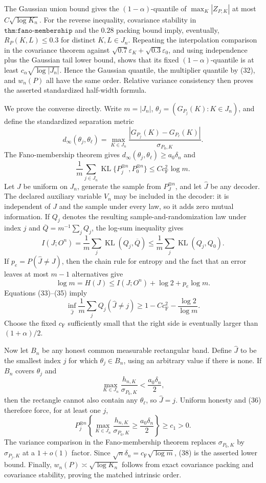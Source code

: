 The Gaussian union bound gives the \((1-\alpha)\)-quantile of \(\max_K|Z_{P,K}|\) at most \(C\sqrt{\log K_n}\).  For the reverse inequality, covariance stability in \(\texttt{thm:fano-membership}\) and the \(0.28\) packing bound imply, eventually, \(R_P(K,L)\leq0.3\) for distinct \(K,L\in J_n\).  Repeating the interpolation comparison in the covariance theorem against \(\sqrt{0.7}\varepsilon_K+\sqrt{0.3}\varepsilon_0\), and using independence plus the Gaussian tail lower bound, shows that its fixed \((1-\alpha)\)-quantile is at least \(c_\alpha\sqrt{\log|J_n|}\).  Hence the Gaussian quantile, the multiplier quantile by (32), and \(w_n(P)\) all have the same order.  Relative variance consistency then proves the asserted standardized half-width formula.

We prove the converse directly.  Write \(m=|J_n|\), \(\theta_j=(G_{P_j}(K):K\in J_n)\), and define the standardized separation metric
\[
 d_\infty(\theta_j,\theta_\ell)=
 \max_{K\in J_n}\frac{|G_{P_j}(K)-G_{P_\ell}(K)|}{\sigma_{P_0,K}}.
\]
The Fano-membership theorem gives \(d_\infty(\theta_j,\theta_\ell)\geq a_0\delta_n\) and
\[
 \frac1m\sum_{j\in J_n}\operatorname{KL}\{P_j^{\otimes n},P_0^{\otimes n}\}
 \leq Cc_{\mathrm F}^2\log m. \tag{33}
\]
Let \(J\) be uniform on \(J_n\), generate the sample from \(P_J^{\otimes n}\), and let \(\widehat J\) be any decoder.  The declared auxiliary variable \(V_n\) may be included in the decoder: it is independent of \(J\) and the sample under every law, so it adds zero mutual information.  If \(Q_j\) denotes the resulting sample-and-randomization law under index \(j\) and \(\overline Q=m^{-1}\sum_jQ_j\), the log-sum inequality gives
\[
 I(J;O^n)=\frac1m\sum_j\operatorname{KL}(Q_j,\overline Q)
 \leq\frac1m\sum_j\operatorname{KL}(Q_j,Q_0). \tag{34}
\]
If \(p_e=P(\widehat J\ne J)\), then the chain rule for entropy and the fact that an error leaves at most \(m-1\) alternatives give
\[
 \log m=H(J)\leq I(J;O^n)+\log2+p_e\log m. \tag{35}
\]
Equations (33)--(35) imply
\[
 \inf_{\widehat J}\frac1m\sum_jQ_j(\widehat J\ne j)
 \geq1-Cc_{\mathrm F}^2-\frac{\log2}{\log m}. \tag{36}
\]
Choose the fixed \(c_{\mathrm F}\) sufficiently small that the right side is eventually larger than \((1+\alpha)/2\).

Now let \(B_n\) be any honest common measurable rectangular band.  Define \(\widehat J\) to be the smallest index \(j\) for which \(\theta_j\in B_n\), using an arbitrary value if there is none.  If \(B_n\) covers \(\theta_j\) and
\[
 \max_{K\in J_n}\frac{h_{n,K}}{\sigma_{P_0,K}}<\frac{a_0\delta_n}{2}, \tag{37}
\]
then the rectangle cannot also contain any \(\theta_\ell\), so \(\widehat J=j\).  Uniform honesty and (36) therefore force, for at least one \(j\),
\[
 P_j^{\otimes n}\left\{\max_{K\in J_n}\frac{h_{n,K}}{\sigma_{P_0,K}}
 \geq\frac{a_0\delta_n}{2}\right\}\geq c_1>0. \tag{38}
\]
The variance comparison in the Fano-membership theorem replaces \(\sigma_{P_0,K}\) by \(\sigma_{P_j,K}\) at a \(1+o(1)\) factor.  Since \(\sqrt n\delta_n=c_{\mathrm F}\sqrt{\log m}\), (38) is the asserted lower bound.  Finally, \(w_n(P)\asymp\sqrt{\log K_n}\) follows from exact covariance packing and covariance stability, proving the matched intrinsic order.